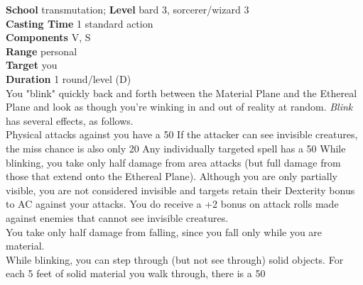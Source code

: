 \textbf{School }transmutation; \textbf{Level }bard 3, sorcerer/wizard 3\\
\textbf{Casting Time }1 standard action\\
\textbf{Components }V, S\\
\textbf{Range }personal\\
\textbf{Target }you\\
\textbf{Duration }1 round/level (D)\\
You "blink" quickly back and forth between the Material Plane and the Ethereal Plane and look as though you're winking in and out of reality at random. \textit{Blink }has several effects, as follows.\\
Physical attacks against you have a 50%
If the attacker can see invisible creatures, the miss chance is also only 20%
Any individually targeted spell has a 50%
While blinking, you take only half damage from area attacks (but full damage from those that extend onto the Ethereal Plane). Although you are only partially visible, you are not considered invisible and targets retain their Dexterity bonus to AC against your attacks. You do receive a +2 bonus on attack rolls made against enemies that cannot see invisible creatures.\\
You take only half damage from falling, since you fall only while you are material.\\
While blinking, you can step through (but not see through) solid objects. For each 5 feet of solid material you walk through, there is a 50%
